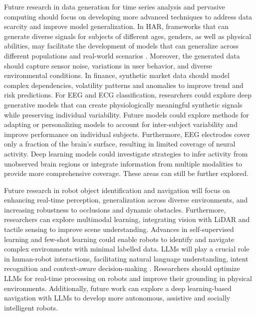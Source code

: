 \documentclass[preprint,12pt]{elsarticle}
\begin{document}
Future research in data generation for time series analysis and pervasive computing should focus on developing more advanced techniques to address data scarcity and improve model generalization. In HAR, frameworks that can generate diverse signals for subjects of different ages, genders, as well as physical abilities, may facilitate the development of models that can generalize across different populations and real-world scenarios \citep{jimale_subject_2023}. Moreover, the generated data should capture sensor noise, variations in user behavior, and diverse environmental conditions. In finance, synthetic market data should model complex dependencies, volatility patterns and anomalies to improve trend and risk predictions. For EEG and ECG classification, researchers could explore deep generative models that can create physiologically meaningful synthetic signals while preserving individual variability. Future models could explore methods for adapting or personalizing models to account for inter-subject variability and improve performance on individual subjects. Furthermore, EEG electrodes cover only a fraction of the brain's surface, resulting in limited coverage of neural activity. Deep learning models could investigate strategies to infer activity from unobserved brain regions or integrate information from multiple modalities to provide more comprehensive coverage. These areas can still be further explored.

Future research in robot object identification and navigation will focus on enhancing real-time perception, generalization across diverse environments, and increasing robustness to occlusions and dynamic obstacles. Furthermore, researchers can explore multimodal learning, integrating vision with LiDAR and tactile sensing to improve scene understanding. Advances in self-supervised learning and few-shot learning could enable robots to identify and navigate complex environments with minimal labelled data. LLMs will play a crucial role in human-robot interactions, facilitating natural language understanding, intent recognition and context-aware decision-making \citep{zhang_large_2023}. Researchers should optimize LLMs for real-time processing on robots and improve their grounding in physical environments. Additionally, future work can explore a deep learning-based navigation with LLMs to develop more autonomous, assistive and socially intelligent robots.
\end{document}
